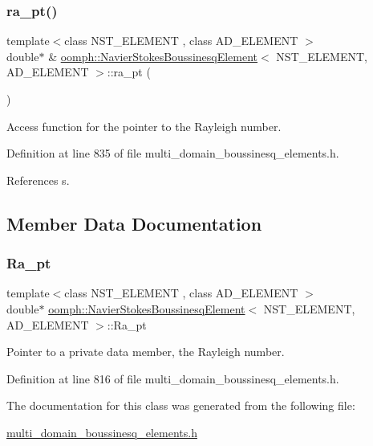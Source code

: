 \subsubsection{\texorpdfstring{ra\+\_\+pt()}{ra\_pt()}}
{\footnotesize\ttfamily template$<$class N\+S\+T\+\_\+\+E\+L\+E\+M\+E\+NT , class A\+D\+\_\+\+E\+L\+E\+M\+E\+NT $>$ \\
double$\ast$ \& \hyperlink{classoomph_1_1NavierStokesBoussinesqElement}{oomph\+::\+Navier\+Stokes\+Boussinesq\+Element}$<$ N\+S\+T\+\_\+\+E\+L\+E\+M\+E\+NT, A\+D\+\_\+\+E\+L\+E\+M\+E\+NT $>$\+::ra\+\_\+pt (\begin{DoxyParamCaption}{ }\end{DoxyParamCaption})\hspace{0.3cm}{\ttfamily [inline]}}



Access function for the pointer to the Rayleigh number. 



Definition at line 835 of file multi\+\_\+domain\+\_\+boussinesq\+\_\+elements.\+h.



References s.



\subsection{Member Data Documentation}
\mbox{\label{classoomph_1_1NavierStokesBoussinesqElement_a0f1c9b6947324c4d5386b9b68abba2d1}} 
\subsubsection{\texorpdfstring{Ra\+\_\+pt}{Ra\_pt}}
{\footnotesize\ttfamily template$<$class N\+S\+T\+\_\+\+E\+L\+E\+M\+E\+NT , class A\+D\+\_\+\+E\+L\+E\+M\+E\+NT $>$ \\
double$\ast$ \hyperlink{classoomph_1_1NavierStokesBoussinesqElement}{oomph\+::\+Navier\+Stokes\+Boussinesq\+Element}$<$ N\+S\+T\+\_\+\+E\+L\+E\+M\+E\+NT, A\+D\+\_\+\+E\+L\+E\+M\+E\+NT $>$\+::Ra\+\_\+pt\hspace{0.3cm}{\ttfamily [private]}}



Pointer to a private data member, the Rayleigh number. 



Definition at line 816 of file multi\+\_\+domain\+\_\+boussinesq\+\_\+elements.\+h.



The documentation for this class was generated from the following file\+:\begin{DoxyCompactItemize}
\item 
\hyperlink{multi__domain__boussinesq__elements_8h}{multi\+\_\+domain\+\_\+boussinesq\+\_\+elements.\+h}\end{DoxyCompactItemize}
